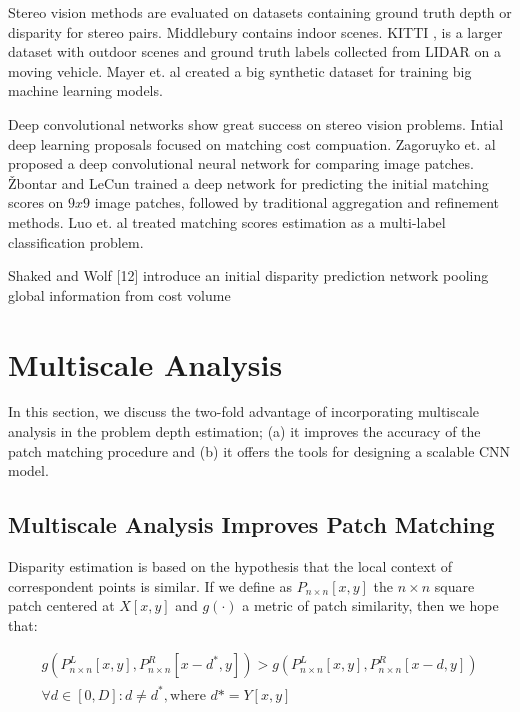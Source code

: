 \documentclass[runningheads]{llncs}
\begin{document}
Stereo vision methods are evaluated on datasets containing ground truth depth or disparity for stereo pairs. Middlebury \cite{Scharstein2014} contains indoor scenes. KITTI \cite{Menze2015ISA}, \cite{Menze2018JPRS} is a larger dataset with outdoor scenes and ground truth labels collected from LIDAR on a moving vehicle. Mayer et. al \cite{Mayer2016ALD} created a big synthetic dataset for training big machine learning models.

Deep convolutional networks show great success on stereo vision problems. Intial deep learning proposals focused on matching cost compuation. Zagoruyko et. al \cite{Zagoruyko2015LearningNetworks} proposed a deep convolutional neural network for comparing image patches. \v{Z}bontar and LeCun \cite{Zbontar_2015_CVPR} trained a deep network for predicting the initial matching scores on $9x9$ image patches, followed by traditional aggregation and refinement methods. Luo et. al \cite{Luo2016EfficientMatching} treated matching scores estimation as a multi-label classification problem.

Shaked and Wolf [12] introduce an initial disparity prediction network pooling global information from cost volume

\section{Multiscale Analysis}

In this section, we discuss the two-fold advantage of incorporating multiscale analysis in the problem depth estimation; (a) it improves the accuracy of the patch matching procedure and (b) it offers the tools for designing a scalable CNN model.

\subsection{Multiscale Analysis Improves Patch Matching}

Disparity estimation is based on the hypothesis that the local context of correspondent points is similar. If we define as $P_{n \times n}[x,y]$ the  $n \times n$ square patch centered at $X[x,y]$ and $g(\cdot)$ a metric of patch similarity, then we hope that:

\begin{equation}
\begin{gathered} \label{eq:similarity_hypothesis}
    g(P^L_{n \times n}[x,y], P^R_{n \times n}[x-d^*,y]) > g(P^L_{n \times n}[x,y], P^R_{n \times n}[x-d,y]) \\
    \forall d \in [0,D] : d \neq d^*, \text{where $d* = Y[x,y]$}
\end{gathered}
\end{equation}
\end{document}
